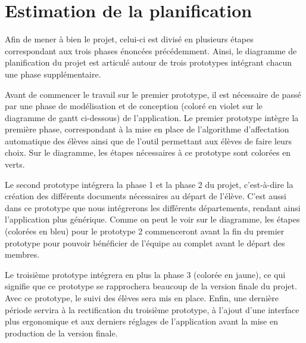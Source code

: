 \chapter{Estimation de la planification}

Afin de mener à bien le projet, celui-ci est divisé en plusieurs étapes correspondant aux trois phases énoncées précédemment.  Ainsi, le diagramme de planification du projet est articulé autour de trois prototypes intégrant chacun une phase supplémentaire. 

Avant de commencer le travail sur le premier prototype, il est nécessaire de passé par une phase de modélisation et de conception (coloré en violet sur le diagramme de gantt ci-dessous) de l’application.
Le premier prototype intègre la première phase, correspondant à la mise en place de l’algorithme d’affectation automatique des élèves ainsi que de l’outil permettant aux élèves de faire leurs choix. Sur le diagramme, les étapes nécessaires à ce prototype sont colorées en verts.

Le second prototype intégrera la phase 1 et la phase 2 du projet, c’est-à-dire la création des différents documents nécessaires au départ de l’élève. C’est aussi dans ce prototype que nous intégrerons les différents départements, rendant ainsi l’application plus générique. Comme on peut le voir sur le diagramme, les étapes (colorées en bleu) pour le prototype 2 commenceront avant la fin du premier prototype pour pouvoir bénéficier de l’équipe au complet avant le départ des membres.

Le troisième prototype intégrera en plus la phase 3 (colorée en jaune), ce qui signifie que ce prototype se rapprochera beaucoup de la version finale du projet. Avec ce prototype, le suivi des élèves sera mis en place.
Enfin, une dernière période servira à la rectification du troisième prototype, à l’ajout d’une interface plus ergonomique et aux derniers réglages de l’application avant  la mise en production de la version finale. 

